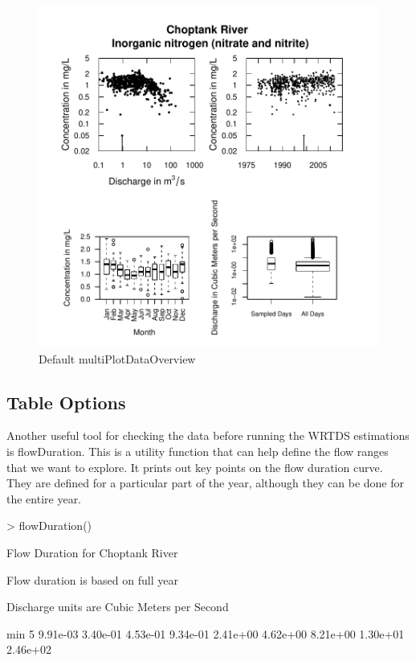\documentclass[a4paper,11pt]{article}
\begin{document}
\begin{figure}[ht]
\begin{center}

\includegraphics{EGRET-figmultiPlotDataOverview}
\end{center}
\caption{Default multiPlotDataOverview}
\label{fig:multiPlotDataOverview}
\end{figure}

\FloatBarrier

\subsection{Table Options}
\label{sec:tableOptionsWQ}
Another useful tool for checking the data before running the WRTDS estimations is flowDuration. This is a utility function that can help define the flow ranges that we want to explore.  It prints out key points on the flow duration curve.  They are defined for a particular part of the year, although they can be done for the entire year.  

\begin{Schunk}
\begin{Sinput}
> flowDuration()
\end{Sinput}
\begin{Soutput}
Flow Duration for Choptank River 

Flow duration is based on full year

Discharge units are Cubic Meters per Second

       min        5%
  9.91e-03  3.40e-01  4.53e-01  9.34e-01  2.41e+00  4.62e+00  8.21e+00  1.30e+01  2.46e+02 
\end{Soutput}
\end{Schunk}
\end{document}
